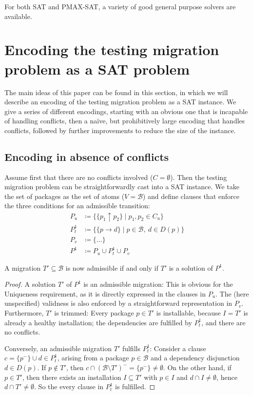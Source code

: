 \documentclass[halfparskip,11pt]{scrartcl}
\begin{document}
For both SAT and PMAX-SAT, a variety of good general purpose solvers are available.

\section{Encoding the testing migration problem as a SAT problem}

The main ideas of this paper can be found in this section, in which we will describe an encoding of the testing migration problem as a SAT instance. We give a series of different encodings, starting with an obvious one that is incapable of handling conflicts, then a naïve, but prohibitively large encoding that handles conflicts, followed by further improvements to reduce the size of the instance.

\subsection{Encoding in absence of conflicts}

Assume first that there are no conflicts involved ($C = \emptyset$). Then the testing migration problem can be straightforwardly cast into a SAT instance. We take the set of packages as the set of atoms ($V=\mathcal B$) and define clauses that enforce the three conditions for an admissible transition:
\begin{align*}
P_u &\coloneqq \{ \{p_1 \uparrow p_2\} \mid p_1,p_2 \in C_u\} \\
P_t^1 &\coloneqq \{ \{ p \to d \} \mid p\in \mathcal B,\ d \in D(p)\}\\
P_v &\coloneqq \{ \ldots \} \\
P^1 &\coloneqq P_u \cup P^1_t \cup P_v
\end{align*}

A migration $T'\subseteq \mathcal B$ is now admissible if and only if $T'$ is a solution of $P^1$.

\begin{proof}
A solution $T'$ of $P^1$ is an admissible migration: This is obvious for the Uniqueness requirement, as it is directly expressed in the clauses in $P_u$. The (here unspecified) validness is also enforced by a straightforward representation in $P_v$.
Furthermore, $T'$ is trimmed: Every package $p\in T'$ is installable, because $I=T'$ is already a healthy installation; the dependencies are fulfilled by $P^1_t$, and there are no conflicts.

Conversely, an admissible migration $T'$ fulfills $P^1_t$: Consider a clause $c=\{p^-\}\cup d\in P^1_t$, arising from a package $p\in \mathcal B$ and a dependency disjunction $d\in D(p)$. If $p\notin T'$, then $c\cap (\mathcal B\setminus T')^- = \{p^-\} \ne \emptyset$. On the other hand, if $p\in T'$, then there exists an installation $I\subseteq T'$ with $p\in I$ and $d\cap I \ne \emptyset$, hence $d\cap T'\ne\emptyset$. So the every clause in $P^1_t$ is fulfilled.
\end{proof}
\end{document}
